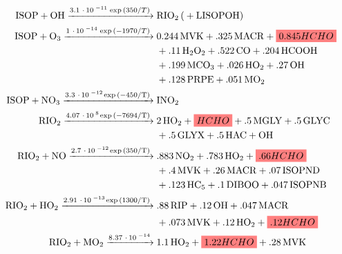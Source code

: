     
    \begin{subequations}
    \label{Model:GC:mechanisms:eqn_mechanisms}
    \begin{align} %
    \ce{
      ISOP + OH ->[3.1*10^{-11} \exp{(350/T})] 
        & RIO2 ( + LISOPOH) \label{mech1}  \\ 
      ISOP + O3 ->[1*10^{-14} \exp{(-1970/T})] 
        & 0.244MVK + .325MACR + \highlight{0.845HCHO} \notag \\
        & + .11H2O2 + .522CO + .204HCOOH \notag \\
        & + .199MCO3 +.026HO2 + .27OH \notag \\
        & + .128PRPE + .051MO2  \label{mech2} \\ 
      ISOP + NO3 ->[3.3*10^{-12} \exp{(-450/T)}] 
        & INO2 \label{mech3} \\
      RIO2 ->[4.07*10^{8} \exp{(-7694/T)}] 
        & 2HO2 + \highlight{HCHO} + .5MGLY + .5GLYC \notag \\
        & + .5GLYX + .5HAC + OH \label{mech4} \\
      RIO2 + NO ->[2.7*10^{-12} \exp{(350/T)}] 
        & .883NO2 + .783HO2 + \highlight{.66HCHO} \notag \\
        & + .4MVK + .26MACR + .07ISOPND \notag \\
        & + .123HC5 + .1DIBOO + .047ISOPNB \label{mech5} \\
      RIO2 + HO2 ->[2.91*10^{-13} \exp{(1300/T)}] 
        & .88RIP + .12OH + .047 MACR \notag \\
        & + .073MVK + .12HO2 + \highlight{.12HCHO} \label{mech6} \\
      RIO2 + MO2 ->[8.37*10^{-14}] 
        & 1.1HO2 + \highlight{1.22HCHO} + .28MVK  \notag\\
}
\end{align}
\end{subequations}
